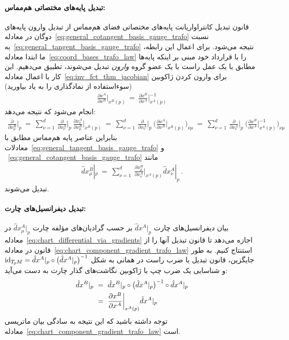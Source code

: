 \paragraph{تبدیل پایه‌های مختصاتی هم‌مماس:}
قانون تبدیل کانتراواریانت پایه‌های مختصاتی فضای هم‌مماس از تبدیل وارون پایه‌های دوگان در معادله~\eqref{eq:general_cotangent_basis_gauge_trafo} نسبت به~\eqref{eq:general_tangent_basis_gauge_trafo} نتیجه می‌شود.
برای اعمال این رابطه، ما ابتدا معادله~\eqref{eq:coord_bases_trafo_law} را با قرارداد خود مبنی بر اینکه پایه‌ها مطابق با یک عمل راست با یک عضو گروه \emph{وارون} تبدیل می‌شوند، تطبیق می‌دهیم.
این کار با اعمال معادله~\eqref{eq:inv_fct_thm_jacobian} برای وارون کردن ژاکوبین (سوءاستفاده از نمادگذاری را به یاد بیاورید)
\begin{align}
	\frac{\partial x^A}{\partial x^B} \bigg|_{x^B(p)} \ =\ 
	\frac{\partial x^B}{\partial x^A} \bigg|_{x^A(p)}^{-1}
\end{align}
انجام می‌شود که نتیجه می‌دهد:
\begin{align}\label{eq:coord_bases_trafo_law_with_inv}
	\frac{\partial}{\partial x^B_\mu} \bigg|_p
	\ =\ \sum_{\nu=1}^d \,
	\frac{\partial}{\partial x^A_\nu} \bigg|_p \ 
	\frac{\partial x^A_\nu}{\partial x^B_\mu} \bigg|_{x^B(p)}
	\ =\ \sum_{\nu=1}^d \,
	\frac{\partial}{\partial x^A_\nu} \bigg|_p \ 
	\bigg( \frac{\partial x^A}{\partial x^B} \bigg|_{x^B(p)} \bigg)_{\nu\mu}
	\ =\ \sum_{\nu=1}^d \,
	\frac{\partial}{\partial x^A_\nu} \bigg|_p \ 
	\bigg( \frac{\partial x^B}{\partial x^A} \bigg|_{x^A(p)}^{-1} \bigg)_{\nu\mu}
\end{align}
بنابراین عناصر پایه هم‌مماس مطابق با معادلات~\eqref{eq:general_tangent_basis_gauge_trafo} و ~\eqref{eq:general_cotangent_basis_gauge_trafo} مانند
\begin{align}\label{eq:chart_component_gradient_trafo_law}
	\hat{d}x^B_\mu|_p \ =\ 
	\sum_{\nu=1}^d\ 
	\frac{\partial x^B_\mu}{\partial x^A_\nu} \bigg|_{x^A(p)}
	\hat{d}x^A_\nu|_p \,.
\end{align}
تبدیل می‌شوند.



\paragraph{تبدیل دیفرانسیل‌های چارت:}
بیان دیفرانسیل‌های چارت $\hat{d}x^A|_p$ بر حسب گرادیان‌های مؤلفه چارت $\hat{d}x^A_\mu|_p$ در معادله~\eqref{eq:chart_differential_via_gradients} اجازه می‌دهد تا قانون تبدیل آنها را از قانون در معادله~\eqref{eq:chart_component_gradient_trafo_law} استنتاج کنیم.
به طور جایگزین، قانون تبدیل با ضرب راست در همانی به شکل $\mathrm{id}_{T_{\mkern-1.5mu p}\mkern-.5muM} = \hat{d}x^A|_p \circ \big( \hat{d}x^A|_p \big)^{-1}$ و شناسایی یک ضرب چپ با ژاکوبین نگاشت‌های گذار چارت به دست می‌آید:
\begin{align}\label{eq:chart_differential_trafo_law}
	\hat{d}x^B|_p
	\ &=\ \hat{d}x^B|_p \circ \big( \hat{d}x^A|_p \big)^{-1} \circ \hat{d}x^A|_p \notag \\
	\ &=\ \frac{\partial x^B}{\partial x^A} \bigg|_{x^A(p)} \hat{d}x^A|_p
\end{align}
توجه داشته باشید که این نتیجه به سادگی بیان ماتریسی معادله~\eqref{eq:chart_component_gradient_trafo_law} است.


